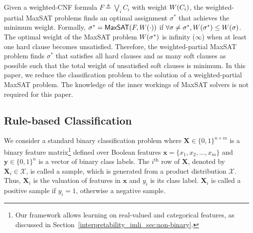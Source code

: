 Given a weighted-CNF formula $F \triangleq \bigvee_i C_i$ with weight $ W \! \left( C_i \right) $, the weighted-partial MaxSAT problems finds an optimal assignment $\sigma^*$ that achieves the minimum weight. Formally,  $\sigma^* = \mathsf{MaxSAT}(F,W \! \left( \cdot \right))$ if $\forall \sigma \neq \sigma^*, W \! \left( \sigma^* \right) \leq W \! \left( \sigma \right)$. The optimal weight of the MaxSAT problem $  W \! \left( \sigma^* \right) $ is infinity ($ \infty $) when at least one hard clause becomes unsatisfied.  Therefore,  the weighted-partial MaxSAT problem finds $ \sigma^* $ that satisfies all hard clauses and as many soft clauses as possible such that the total weight of unsatisfied soft clauses is minimum. In this paper, we reduce the classification problem  to the solution of a weighted-partial MaxSAT problem. The knowledge of the inner workings of {MaxSAT} solvers is  not required for this paper.  

%


\subsection*{Rule-based Classification}

We consider a standard binary classification problem where $ \mathbf{X} \in \{0,1\}^{n\times m} $ is a binary feature matrix\footnote{Our framework allows learning on real-valued and categorical features, as discussed in Section~\ref{interpretability_imli_sec:non-binary}.} defined over Boolean features $\mathbf{x} = \{x_1, x_2, \dots, x_m\}$ and $ \mathbf{y} \in \{0,1\}^n $ is a vector of binary class labels.  The $ i^\text{th} $ row of $ \mathbf{X} $, denoted by $ \mathbf{X}_i \in \mathcal{X} $, is called a sample, which is generated from a product distribution $ \mathcal{X} $. Thus, $ \mathbf{X}_i $ is the valuation of features in $ \mathbf{x} $ and $ y_i $ is its class label.  $ \mathbf{X}_i $ is called a positive sample if $ y_i = 1 $, otherwise a negative sample.


